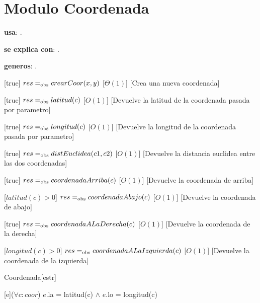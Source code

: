 \section{Modulo Coordenada}


\begin{Interfaz}

  \textbf{usa}: .

  \textbf{se explica con}: .

  \textbf{generos}: .

  [true]
  {$res =_{\mathrm{obs}} crearCoor(x, y)$}
  [$\Theta(1)$]
  [Crea una nueva coordenada]

  [true]
  {$res =_{\mathrm{obs}} latitud(c)$}
  [$O(1)$]
  [Devuelve la latitud de la coordenada pasada por parametro]

  [true]
  {$res =_{\mathrm{obs}} longitud(c)$}
  [$O(1)$]
  [Devuelve la longitud de la coordenada pasada por parametro]
  
  [true]
  {$res =_{\mathrm{obs}} distEuclidea(c1, c2)$}
  [$O(1)$]
  [Devuelve la distancia euclidea entre las dos coordenadas]
  
  [true]
  {$res =_{\mathrm{obs}} coordenadaArriba(c)$}
  [$O(1)$]
  [Devuelve la coordenada de arriba]
  
  [$latitud(c) > 0$]
  {$res =_{\mathrm{obs}} coordenadaAbajo(c)$}
  [$O(1)$]
  [Devuelve la coordenada de abajo]

  [true]
  {$res =_{\mathrm{obs}} coordenadaALaDerecha(c)$}
  [$O(1)$]
  [Devuelve la coordenada de la derecha]
  
  [$longitud(c) > 0$]
  {$res =_{\mathrm{obs}} coordenadaALaIzquierda(c)$}
  [$O(1)$]
  [Devuelve la coordenada de la izquierda]
  
\end{Interfaz}

\begin{Representacion}
	\begin{Estructura}{Coordenada}[estr]
		\begin{Tupla}[estr]
		\end{Tupla}
	\end{Estructura}

	{($\forall c : coor$) $e$.la = latitud(c) $\land$ $e$.lo = longitud(c)}
\end{Representacion}

